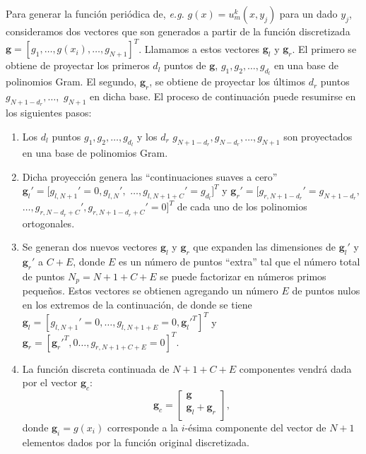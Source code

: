 Para generar la función periódica de, \textit{e.g.} $g(x)=u^k_m(x,y_j)$ para un dado $y_j$, 
consideramos dos vectores 
que son generados a partir de la función discretizada 
$\mathbf{g}=[g_1,\ldots,g(x_i),\ldots,g_{N+1}]^T$. Llamamos a estos vectores
$\mathbf{g}_l$ y $\mathbf{g}_r$. El primero 
se obtiene de proyectar los primeros $d_l$ puntos de $\mathbf{g}$, $g_1,g_2,\ldots,g_{d_l}$ 
en una base de polinomios Gram. El segundo, $\mathbf{g}_r$, se 
obtiene de proyectar los últimos $d_r$ puntos $g_{N+1-d_r},\ldots,$ $g_{N+1}$ en dicha base. 
El proceso de continuación puede resumirse en los siguientes pasos:
\begin{enumerate}
\item Los $d_l$ puntos $g_1,g_2,\ldots,g_{d_l}$
y los $d_r$ $g_{N+1-d_r},g_{N-d_r},\ldots,g_{N+1}$ 
son proyectados en una base de polinomios Gram.

\item Dicha proyección genera las ``continuaciones suaves a cero'' 
$\mathbf{g}_l'=[g_{l,N+1}'=0,g_{l,N}',$ $\ldots,g_{l,N+1+C}'=g_{d_l}]^T$ y 
$\mathbf{g}_r'=[g_{r,N+1-d_r}'=g_{N+1-d_r},$ $\ldots,g_{r,N-d_r+C}',
g_{r,N+1-d_r+C}'=0]^T$ de cada 
uno de los polinomios ortogonales.

\item Se generan dos nuevos vectores $\mathbf{g}_l$ y $\mathbf{g}_r$ 
que expanden las dimensiones de $\mathbf{g}_l'$ y $\mathbf{g}_r'$ a $C+E$, 
donde $E$ es un número de puntos ``extra'' tal que el número total de puntos 
$N_p=N+1+C+E$ se puede factorizar en números primos pequeños. Estos 
vectores se obtienen agregando un número $E$ de puntos nulos 
en los extremos de la continuación, de donde se tiene 
$\mathbf{g}_l=[g_{l,N+1}'=0,\ldots,g_{l,N+1+E}=0,\mathbf{g}_l'^T]^T$
y $\mathbf{g}_r=[\mathbf{g}_r'^T,0\ldots,g_{r,N+1+C+E}=0]^T$.

\item La función discreta continuada de $N+1+C+E$ componentes 
vendrá dada por el vector $\mathbf{g}_c$:  
\begin{equation*}
\mathbf{g}_c=
\begin{bmatrix}
    \mathbf{g} \\
    \mathbf{g}_l+\mathbf{g}_r  \\
\end{bmatrix}
,
\label{eq:FCStepsCondensed}
\end{equation*}
donde $\mathbf{g}_i=g(x_i)$ corresponde a la $i$-ésima componente del vector 
de $N+1$ elementos dados por la función original discretizada.
\end{enumerate}

